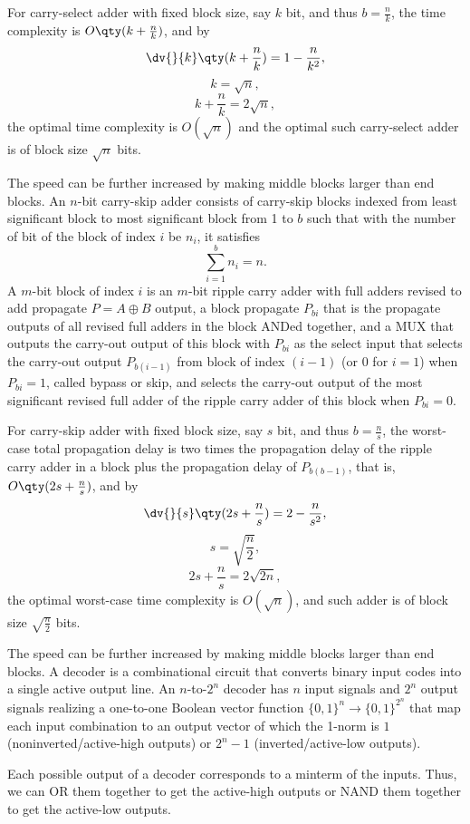 \documentclass[a4paper,12pt]{report}
\begin{document}
For carry-select adder with fixed block size, say $k$ bit, and thus $b=\frac{n}{k}$, the time complexity is $O\qty(k+\frac{n}{k})$, and by
\[\dv{}{k}\qty(k+\frac{n}{k})=1-\frac{n}{k^2},\]
\[k=\sqrt{n},\]
\[k+\frac{n}{k}=2\sqrt{n},\]
the optimal time complexity is $O(\sqrt{n})$ and the optimal such carry-select adder is of block size $\sqrt{n}$ bits.

The speed can be further increased by making middle blocks larger than end blocks.
An $n$-bit carry-skip adder consists of carry-skip blocks indexed from least significant block to most significant block from 1 to $b$ such that with the number of bit of the block of index $i$ be $n_i$, it satisfies
\[\sum_{i=1}^bn_i=n.\]
A $m$-bit block of index $i$ is an $m$-bit ripple carry adder with full adders revised to add propagate $P=A\oplus B$ output, a block propagate $P_{bi}$ that is the propagate outputs of all revised full adders in the block ANDed together, and a MUX that outputs the carry-out output of this block with $P_{bi}$ as the select input that selects the carry-out output $P_{b(i-1)}$ from block of index $(i-1)$ (or 0 for $i=1$) when $P_{bi}=1$, called bypass or skip, and selects the carry-out output of the most significant revised full adder of the ripple carry adder of this block when $P_{bi}=0$.

For carry-skip adder with fixed block size, say $s$ bit, and thus $b=\frac{n}{s}$, the worst-case total propagation delay is two times the propagation delay of the ripple carry adder in a block plus the propagation delay of $P_{b(b-1)}$, that is, $O\qty(2s+\frac{n}{s})$, and by
\[\dv{}{s}\qty(2s+\frac{n}{s})=2-\frac{n}{s^2},\]
\[s=\sqrt{\frac{n}{2}},\]
\[2s+\frac{n}{s}=2\sqrt{2n},\]
the optimal worst-case time complexity is $O(\sqrt{n})$, and such adder is of block size $\sqrt{\frac{n}{2}}$ bits.

The speed can be further increased by making middle blocks larger than end blocks.
A decoder is a combinational circuit that converts binary input codes into a single active output line. An $n$-to-$2^n$ decoder has $n$ input signals and $2^n$ output signals realizing a one-to-one Boolean vector function $\{0,1\}^n\to\{0,1\}^{2^n}$ that map each input combination to an output vector of which the 1-norm is $1$ (noninverted/active-high outputs) or $2^n-1$ (inverted/active-low outputs).

Each possible output of a decoder corresponds to a minterm of the inputs. Thus, we can OR them together to get the active-high outputs or NAND them together to get the active-low outputs.
\end{document}
